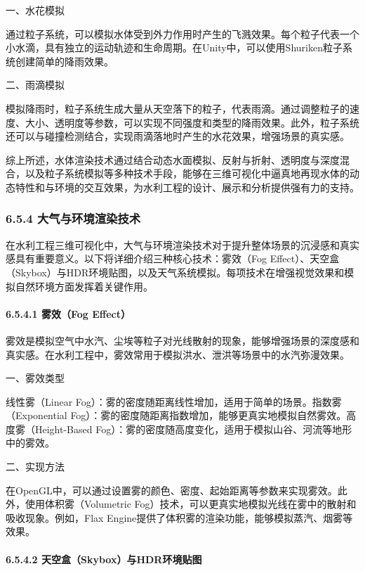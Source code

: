 一、水花模拟

通过粒子系统，可以模拟水体受到外力作用时产生的飞溅效果。每个粒子代表一个小水滴，具有独立的运动轨迹和生命周期。在Unity中，可以使用Shuriken粒子系统创建简单的降雨效果。

二、雨滴模拟

模拟降雨时，粒子系统生成大量从天空落下的粒子，代表雨滴。通过调整粒子的速度、大小、透明度等参数，可以实现不同强度和类型的降雨效果。此外，粒子系统还可以与碰撞检测结合，实现雨滴落地时产生的水花效果，增强场景的真实感。

综上所述，水体渲染技术通过结合动态水面模拟、反射与折射、透明度与深度混合，以及粒子系统模拟等多种技术手段，能够在三维可视化中逼真地再现水体的动态特性和与环境的交互效果，为水利工程的设计、展示和分析提供强有力的支持。

\subsubsection{6.5.4 大气与环境渲染技术}\label{ux5927ux6c14ux4e0eux73afux5883ux6e32ux67d3ux6280ux672f}

在水利工程三维可视化中，大气与环境渲染技术对于提升整体场景的沉浸感和真实感具有重要意义。以下将详细介绍三种核心技术：雾效（Fog Effect）、天空盒（Skybox）与HDR环境贴图，以及天气系统模拟。每项技术在增强视觉效果和模拟自然环境方面发挥着关键作用。

\paragraph{6.5.4.1 雾效（Fog Effect）}\label{ux96feux6548fog-effect}

雾效是模拟空气中水汽、尘埃等粒子对光线散射的现象，能够增强场景的深度感和真实感。在水利工程中，雾效常用于模拟洪水、泄洪等场景中的水汽弥漫效果。

一、雾效类型

线性雾（Linear Fog）：雾的密度随距离线性增加，适用于简单的场景。指数雾（Exponential Fog）：雾的密度随距离指数增加，能够更真实地模拟自然雾效。高度雾（Height-Based Fog）：雾的密度随高度变化，适用于模拟山谷、河流等地形中的雾效。

二、实现方法

在OpenGL中，可以通过设置雾的颜色、密度、起始距离等参数来实现雾效。此外，使用体积雾（Volumetric Fog）技术，可以更真实地模拟光线在雾中的散射和吸收现象。例如，Flax Engine提供了体积雾的渲染功能，能够模拟蒸汽、烟雾等效果。

\paragraph{6.5.4.2 天空盒（Skybox）与HDR环境贴图}\label{ux5929ux7a7aux76d2skyboxux4e0ehdrux73afux5883ux8d34ux56fe}

